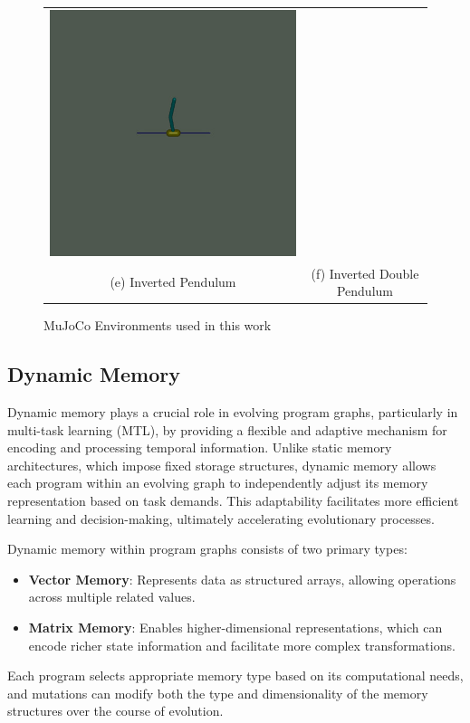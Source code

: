\documentclass[sigconf]{acmart}
\begin{document}
\begin{figure}[t]
\begin{tabular}{cc}
    \includegraphics[width=0.3\linewidth]{assets/inverted_double_pendulum} \\
    (e) Inverted Pendulum & (f) Inverted Double Pendulum \\
  \end{tabular}
  \caption{MuJoCo Environments used in this work}
  \label{fig:mujoco_env}
\end{figure}

\subsection{Dynamic Memory}
Dynamic memory plays a crucial role in evolving program graphs, particularly 
in multi-task learning (MTL), by providing a flexible and adaptive
mechanism for encoding and processing temporal information. Unlike static memory 
architectures, which impose fixed storage structures, dynamic memory allows each 
program within an evolving graph to independently adjust its memory representation 
based on task demands. This adaptability facilitates more efficient learning and 
decision-making, ultimately accelerating evolutionary processes.

Dynamic memory within program graphs consists of two primary types:
\begin{itemize}
  \item \textbf{Vector Memory}: Represents data as structured arrays, allowing operations across multiple related values.
  \item \textbf{Matrix Memory}: Enables higher-dimensional representations, which can encode richer state information 
  and facilitate more complex transformations.
\end{itemize}

Each program selects appropriate memory type based on its computational needs, 
and mutations can modify both the type and dimensionality of the memory structures over the course of evolution.
\end{document}
